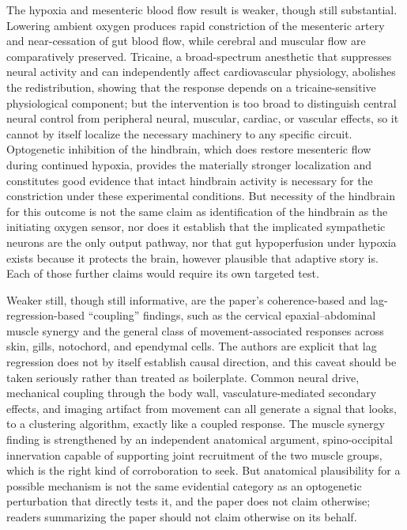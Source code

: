 \documentclass[11pt]{article}
\begin{document}
The hypoxia and mesenteric blood flow result is weaker, though still substantial. Lowering ambient oxygen produces rapid constriction of the mesenteric artery and near-cessation of gut blood flow, while cerebral and muscular flow are comparatively preserved. Tricaine, a broad-spectrum anesthetic that suppresses neural activity and can independently affect cardiovascular physiology, abolishes the redistribution, showing that the response depends on a tricaine-sensitive physiological component; but the intervention is too broad to distinguish central neural control from peripheral neural, muscular, cardiac, or vascular effects, so it cannot by itself localize the necessary machinery to any specific circuit. Optogenetic inhibition of the hindbrain, which does restore mesenteric flow during continued hypoxia, provides the materially stronger localization and constitutes good evidence that intact hindbrain activity is necessary for the constriction under these experimental conditions. But necessity of the hindbrain for this outcome is not the same claim as identification of the hindbrain as the initiating oxygen sensor, nor does it establish that the implicated sympathetic neurons are the only output pathway, nor that gut hypoperfusion under hypoxia exists because it protects the brain, however plausible that adaptive story is. Each of those further claims would require its own targeted test.

Weaker still, though still informative, are the paper's coherence-based and lag-regression-based ``coupling'' findings, such as the cervical epaxial--abdominal muscle synergy and the general class of movement-associated responses across skin, gills, notochord, and ependymal cells. The authors are explicit that lag regression does not by itself establish causal direction, and this caveat should be taken seriously rather than treated as boilerplate. Common neural drive, mechanical coupling through the body wall, vasculature-mediated secondary effects, and imaging artifact from movement can all generate a signal that looks, to a clustering algorithm, exactly like a coupled response. The muscle synergy finding is strengthened by an independent anatomical argument, spino-occipital innervation capable of supporting joint recruitment of the two muscle groups, which is the right kind of corroboration to seek. But anatomical plausibility for a possible mechanism is not the same evidential category as an optogenetic perturbation that directly tests it, and the paper does not claim otherwise; readers summarizing the paper should not claim otherwise on its behalf.
\end{document}
